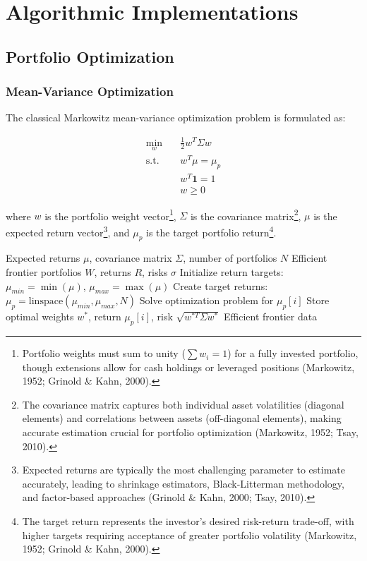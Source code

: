 \documentclass[12pt,a4paper]{article}
\theoremstyle{definition}
\theoremstyle{remark}
\begin{document}
\section{Algorithmic Implementations}

\subsection{Portfolio Optimization}

\subsubsection{Mean-Variance Optimization}

The classical Markowitz mean-variance optimization problem is formulated as:

\begin{equation}
\begin{aligned}
\min_{w} \quad & \frac{1}{2} w^T \Sigma w \\
\text{s.t.} \quad & w^T \mu = \mu_p \\
& w^T \mathbf{1} = 1 \\
& w \geq 0
\end{aligned}
\end{equation}

where $w$ is the portfolio weight vector\footnote{Portfolio weights must sum to unity ($\sum w_i = 1$) for a fully invested portfolio, though extensions allow for cash holdings or leveraged positions (Markowitz, 1952; Grinold \& Kahn, 2000).}, $\Sigma$ is the covariance matrix\footnote{The covariance matrix captures both individual asset volatilities (diagonal elements) and correlations between assets (off-diagonal elements), making accurate estimation crucial for portfolio optimization (Markowitz, 1952; Tsay, 2010).}, $\mu$ is the expected return vector\footnote{Expected returns are typically the most challenging parameter to estimate accurately, leading to shrinkage estimators, Black-Litterman methodology, and factor-based approaches (Grinold \& Kahn, 2000; Tsay, 2010).}, and $\mu_p$ is the target portfolio return\footnote{The target return represents the investor's desired risk-return trade-off, with higher targets requiring acceptance of greater portfolio volatility (Markowitz, 1952; Grinold \& Kahn, 2000).}.

\begin{algorithm}
\caption{Efficient Frontier Computation}
\begin{algorithmic}[1]
\REQUIRE Expected returns $\mu$, covariance matrix $\Sigma$, number of portfolios $N$
\ENSURE Efficient frontier portfolios $W$, returns $R$, risks $\sigma$
\STATE Initialize return targets: $\mu_{min} = \min(\mu)$, $\mu_{max} = \max(\mu)$
\STATE Create target returns: $\mu_p = \text{linspace}(\mu_{min}, \mu_{max}, N)$
    \STATE Solve optimization problem for $\mu_p[i]$
    \STATE Store optimal weights $w^*$, return $\mu_p[i]$, risk $\sqrt{w^{*T}\Sigma w^*}$
\ENDFOR
\RETURN Efficient frontier data
\end{algorithmic}
\end{algorithm}
\end{document}

